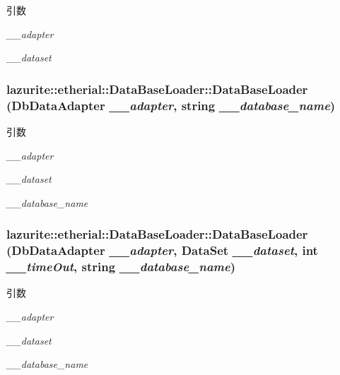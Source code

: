 \begin{DoxyParams}{引数}
\item[{\em \_\-\_\-adapter}]\item[{\em \_\-\_\-dataset}]\end{DoxyParams}
\hypertarget{classlazurite_1_1etherial_1_1_data_base_loader_aa2a43059ad5d48167b70f83850b5cee0}{
\subsubsection[{DataBaseLoader}]{\setlength{\rightskip}{0pt plus 5cm}lazurite::etherial::DataBaseLoader::DataBaseLoader (DbDataAdapter {\em \_\-\_\-adapter}, \/  string {\em \_\-\_\-database\_\-name})}}
\label{classlazurite_1_1etherial_1_1_data_base_loader_aa2a43059ad5d48167b70f83850b5cee0}

\begin{DoxyParams}{引数}
\item[{\em \_\-\_\-adapter}]\item[{\em \_\-\_\-dataset}]\item[{\em \_\-\_\-database\_\-name}]\end{DoxyParams}
\hypertarget{classlazurite_1_1etherial_1_1_data_base_loader_abaac2cdc7ca5defd6e0bc239ddfb17f7}{
\subsubsection[{DataBaseLoader}]{\setlength{\rightskip}{0pt plus 5cm}lazurite::etherial::DataBaseLoader::DataBaseLoader (DbDataAdapter {\em \_\-\_\-adapter}, \/  DataSet {\em \_\-\_\-dataset}, \/  int {\em \_\-\_\-timeOut}, \/  string {\em \_\-\_\-database\_\-name})}}
\label{classlazurite_1_1etherial_1_1_data_base_loader_abaac2cdc7ca5defd6e0bc239ddfb17f7}

\begin{DoxyParams}{引数}
\item[{\em \_\-\_\-adapter}]\item[{\em \_\-\_\-dataset}]\item[{\em \_\-\_\-database\_\-name}]\end{DoxyParams}


